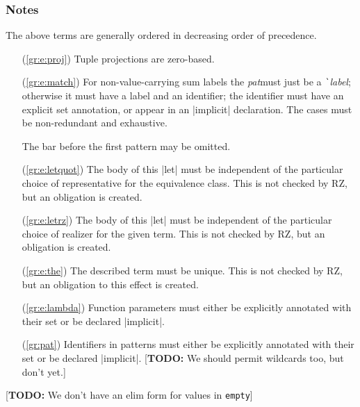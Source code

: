 \documentclass[11pt]{article}
\newcommand{\metav}[1]{\mbox{\textit{#1}}}
\newcommand{\Label}{\metav{\texttt{\`}label}}
\newcommand{\Pat}{\metav{pat}}
\newcommand{\TODO}[1]{[\textbf{TODO: }#1]}
\begin{document}
\subsubsection*{Notes}
The above terms are generally ordered in decreasing order of precedence. 

\begin{itemize}
	\item[(\ref{gr:e:proj})] Tuple projections are zero-based.
	\item[(\ref{gr:e:match})]
  For non-value-carrying sum labels the \Pat must just be a \Label; otherwise it
  must have a label and an identifier; the identifier must have an explicit set
  annotation, or appear in an |implicit| declaration. The cases must be
  non-redundant and exhaustive.

  The bar before the first pattern may be omitted.

	\item[(\ref{gr:e:letquot})] The body of this |let| must be independent of the particular choice of representative for the equivalence class.  This is not checked by RZ, but an obligation is created.
	\item[(\ref{gr:e:letrz})] The body of this |let| must be independent of the particular choice of realizer for the given term.  This is not checked by RZ, but an obligation is created.
	\item[(\ref{gr:e:the})] The described term must be unique.  This is not checked by RZ, but an obligation to this effect is created. 
	\item[(\ref{gr:e:lambda})] Function parameters must either be explicitly annotated with their set or be declared |implicit|.
	\item[(\ref{gr:pat})] Identifiers in patterns must either be explicitly annotated with their set or be declared |implicit|.
	\TODO{We should permit wildcards too, but don't yet.}
\end{itemize}

\TODO{We don't have an elim form for values in \texttt{empty}}
\end{document}
